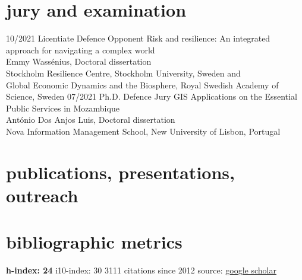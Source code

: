 \documentclass[]{friggeri-cv} %
\begin{document}
\section{jury and examination}

\begin{entrylist}
\entry
{\small{10/2021}}
{Licentiate Defence Opponent}
{}
{Risk and resilience: An integrated approach for navigating a complex world\\
Emmy Wassénius, Doctoral dissertation \\
Stockholm Resilience Centre, Stockholm University, Sweden and \\
Global Economic Dynamics and the Biosphere, Royal Swedish Academy of Science, Sweden}
\entry
{\small{07/2021}}
{Ph.D. Defence Jury}
{}
{GIS Applications on the Essential Public Services in Mozambique\\
António Dos Anjos Luis, Doctoral dissertation \\
Nova Information Management School, New University of Lisbon, Portugal}
\end{entrylist}

\newpage
\section{publications, presentations, outreach}
\section{bibliographic metrics}

\begin{entrylist}
\entry
{\textbf{h-index: 24}}
{\hspace{10pt}i10-index: 30\hspace{35pt} 3111 citations since 2012}
{source: {\href{https://scholar.google.de/citations?user=laRo5pgAAAAJ&hl=en}{google scholar}}}

\end{entrylist}

\begin{refsection}
\nocite{*}
\printbibliography[type={article}, keyword={workpaper}, title={working papers}, heading=subbibliography]
\end{refsection}
\end{document}
